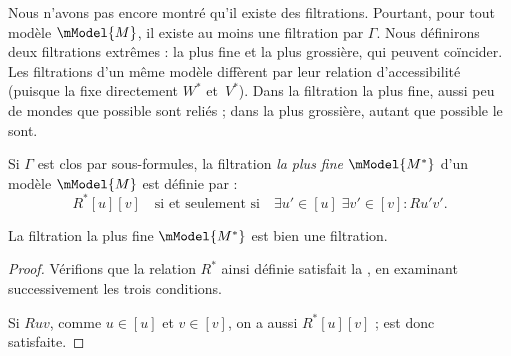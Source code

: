 \documentclass[../../../include/open-logic-section]{subfiles}
\begin{document}


Nous n'avons pas encore montré qu'il existe des filtrations. Pourtant,
pour tout modèle $\mModel{M}$, il existe au moins une filtration par
$\Gamma$. Nous définirons deux filtrations extrêmes : la plus fine et
la plus grossière, qui peuvent coïncider. Les filtrations d'un même modèle
diffèrent par leur relation d'accessibilité (puisque
la  fixe directement $W^*$ et~$V^*$). Dans la
filtration la plus fine, aussi peu de mondes que possible sont reliés ;
dans la plus grossière, autant que possible le sont.

\begin{defn}
  Si $\Gamma$ est clos par sous-formules, la filtration \emph{la plus
  fine} $\mModel{M^*}$ d'un modèle $\mModel{M}$ est définie par :
  \[
  R^*[u][v] \quad \text{si et seulement si} \quad \exists u'\in [u] \;
  \exists v' \in [v] : Ru'v'.
  \]
\end{defn}

\begin{prop}
  La filtration la plus fine $\mModel{M^*}$ est bien une filtration.
\end{prop}

\begin{proof}
  Vérifions que la relation $R^*$ ainsi définie satisfait
  la , en
  examinant successivement les trois conditions.

  Si $Ruv$, comme $u \in [u]$ et $v \in [v]$, on a aussi
  $R^*[u][v]$ ;  est donc satisfaite.


\end{proof}
\end{document}
